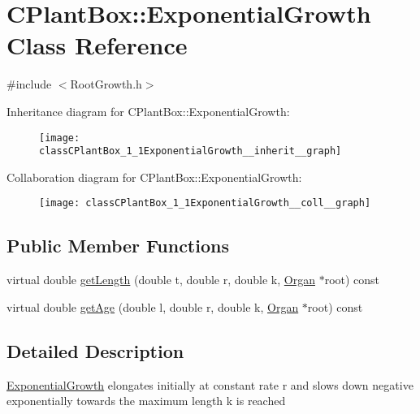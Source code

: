 \hypertarget{classCPlantBox_1_1ExponentialGrowth}{}\section{C\+Plant\+Box\+:\+:Exponential\+Growth Class Reference}
\label{classCPlantBox_1_1ExponentialGrowth}


{\ttfamily \#include $<$Root\+Growth.\+h$>$}



Inheritance diagram for C\+Plant\+Box\+:\+:Exponential\+Growth\+:\nopagebreak
\begin{figure}[H]
\begin{center}
\leavevmode
\texttt{[image: classCPlantBox\_1\_1ExponentialGrowth\_\_inherit\_\_graph]}
\end{center}
\end{figure}


Collaboration diagram for C\+Plant\+Box\+:\+:Exponential\+Growth\+:\nopagebreak
\begin{figure}[H]
\begin{center}
\leavevmode
\texttt{[image: classCPlantBox\_1\_1ExponentialGrowth\_\_coll\_\_graph]}
\end{center}
\end{figure}
\subsection*{Public Member Functions}
\begin{DoxyCompactItemize}
\item 
virtual double \hyperlink{classCPlantBox_1_1ExponentialGrowth_ae5b0f12177b71c66d199fa515698aefa}{get\+Length} (double t, double r, double k, \hyperlink{classCPlantBox_1_1Organ}{Organ} $\ast$root) const
\item 
virtual double \hyperlink{classCPlantBox_1_1ExponentialGrowth_af3fd28ae8c778bc823fc0e51756e8b63}{get\+Age} (double l, double r, double k, \hyperlink{classCPlantBox_1_1Organ}{Organ} $\ast$root) const
\end{DoxyCompactItemize}


\subsection{Detailed Description}
\hyperlink{classCPlantBox_1_1ExponentialGrowth}{Exponential\+Growth} elongates initially at constant rate r and slows down negative exponentially towards the maximum length k is reached 

